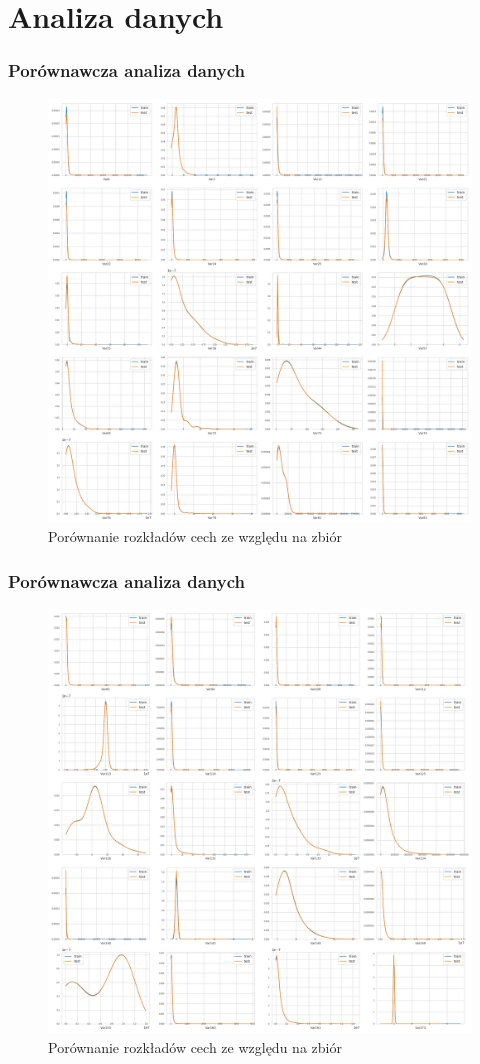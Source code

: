 \documentclass{beamer}
\begin{document}
    \section{Analiza danych}

    \begin{frame}
        \frametitle{Porównawcza analiza danych}
        \begin{figure}
            \centering
            \includegraphics[width=0.7\linewidth]{../images/feature-distribution-0-20-train-test.png}
            \caption{Porównanie rozkładów cech ze względu na zbiór}
            \label{fig:feature-distribution-0-20-train-test}
        \end{figure}
    \end{frame}

    \begin{frame}
        \frametitle{Porównawcza analiza danych}
        \begin{figure}
            \centering
            \includegraphics[width=0.7\linewidth]{../images/feature-distribution-20-40-train-test.png}
            \caption{Porównanie rozkładów cech ze względu na zbiór}
            \label{fig:feature-distribution-20-40-train-test}
        \end{figure}
    \end{frame}
\end{document}
